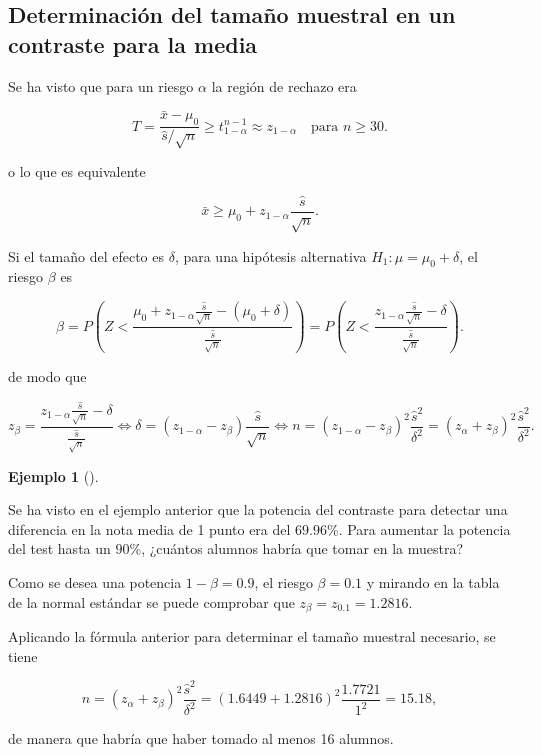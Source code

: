 \documentclass[
  a4paper,
]{scrreport}
\theoremstyle{plain}
\theoremstyle{definition}
\newtheorem{example}{Ejemplo}[chapter]
\theoremstyle{definition}
\theoremstyle{remark}
\begin{document}
\subsection{Determinación del tamaño muestral en un contraste para la
media}\label{determinaciuxf3n-del-tamauxf1o-muestral-en-un-contraste-para-la-media}

Se ha visto que para un riesgo \(\alpha\) la región de rechazo era

\[
T=\frac{\bar x-\mu_0}{\hat s/\sqrt{n}} \geq t^{n-1}_{1-\alpha} \approx z_{1-\alpha}\quad \mbox{para } n\geq 30.
\]

o lo que es equivalente

\[
\bar x \geq \mu_0+z_{1-\alpha}\frac{\hat s}{\sqrt n}.
\]

Si el tamaño del efecto es \(\delta\), para una hipótesis alternativa
\(H_1:\mu=\mu_0+\delta\), el riesgo \(\beta\) es

\[
\beta = P\left(Z< \frac{\mu_0+z_{1-\alpha}\frac{\hat s}{\sqrt n}-(\mu_0+\delta)}{\frac{\hat s}{\sqrt n}} \right) = P\left(Z< \frac{z_{1-\alpha}\frac{\hat s}{\sqrt n}-\delta}{\frac{\hat s}{\sqrt n}} \right).
\]

de modo que

\[
z_\beta = \frac{z_{1-\alpha}\frac{\hat s}{\sqrt n}-\delta}{\frac{\hat s}{\sqrt n}} \Leftrightarrow \delta = (z_{1-\alpha}-z_\beta)\frac{\hat s}{\sqrt n} \Leftrightarrow n = (z_{1-\alpha}-z_\beta)^2\frac{\hat s^2}{\delta^2} = (z_\alpha+z_\beta)^2\frac{\hat s^2}{\delta^2}.
\]

\begin{example}[]\protect\hypertarget{exm-tamaño-muestral-contraste-media}{}\label{exm-tamaño-muestral-contraste-media}

Se ha visto en el ejemplo anterior que la potencia del contraste para
detectar una diferencia en la nota media de 1 punto era del \(69.96%
\)\%. Para aumentar la potencia del test hasta un \(90\)\%, ¿cuántos
alumnos habría que tomar en la muestra?

Como se desea una potencia \(1-\beta=0.9\), el riesgo \(\beta=0.1\) y
mirando en la tabla de la normal estándar se puede comprobar que
\(z_\beta = z_{0.1}=1.2816\).

Aplicando la fórmula anterior para determinar el tamaño muestral
necesario, se tiene

\[
n = (z_\alpha+z_\beta)^2\frac{\hat s^2}{\delta^2} = (1.6449+1.2816)^2\frac{1.7721}{1^2} = 15.18,
\]

de manera que habría que haber tomado al menos 16 alumnos.

\end{example}
\end{document}
